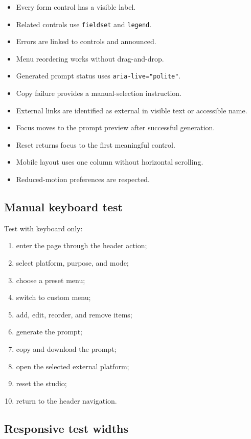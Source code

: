 \documentclass[11pt,letterpaper]{article}
\begin{document}
\begin{itemize}
    \item Every form control has a visible label.
    \item Related controls use \texttt{fieldset} and \texttt{legend}.
    \item Errors are linked to controls and announced.
    \item Menu reordering works without drag-and-drop.
    \item Generated prompt status uses \texttt{aria-live="polite"}.
    \item Copy failure provides a manual-selection instruction.
    \item External links are identified as external in visible text or accessible name.
    \item Focus moves to the prompt preview after successful generation.
    \item Reset returns focus to the first meaningful control.
    \item Mobile layout uses one column without horizontal scrolling.
    \item Reduced-motion preferences are respected.
\end{itemize}

\subsection{Manual keyboard test}

Test with keyboard only:

\begin{enumerate}
    \item enter the page through the header action;
    \item select platform, purpose, and mode;
    \item choose a preset menu;
    \item switch to custom menu;
    \item add, edit, reorder, and remove items;
    \item generate the prompt;
    \item copy and download the prompt;
    \item open the selected external platform;
    \item reset the studio;
    \item return to the header navigation.
\end{enumerate}

\subsection{Responsive test widths}
\end{document}
